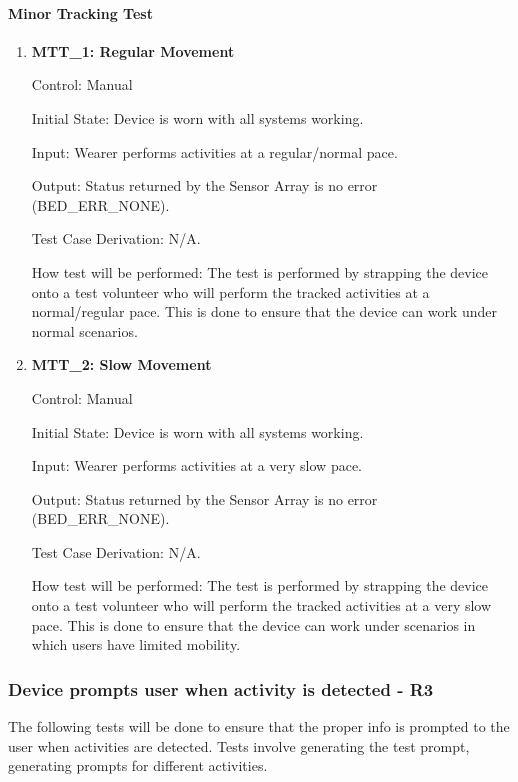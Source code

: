 \documentclass[12pt, titlepage]{article}
\begin{document}
\paragraph{Minor Tracking Test}
\begin{enumerate}
	\item{\textbf{MTT\_1: Regular Movement} \\}
	
		Control: Manual 
							
		Initial State: Device is worn with all systems working.
							
		Input: Wearer performs activities at a regular/normal pace.
		
		Output: Status returned by the Sensor Array is no error (BED\_ERR\_NONE).
		
		Test Case Derivation: N/A.
							
		How test will be performed: The test is performed by strapping the device onto a test volunteer who will perform the tracked activities at a normal/regular pace. This is done to ensure that the device can 				work under normal scenarios.

	\item{\textbf{MTT\_2: Slow Movement} \\}
	
		Control: Manual 
							
		Initial State: Device is worn with all systems working.
							
		Input: Wearer performs activities at a very slow pace.
		
		Output: Status returned by the Sensor Array is no error (BED\_ERR\_NONE).
		
		Test Case Derivation: N/A.
							
		How test will be performed: The test is performed by strapping the device onto a test volunteer who will perform the tracked activities at a very slow pace. This is done to ensure that the device can 						work under scenarios in which users have limited mobility.	

\end{enumerate}
\subsubsection{Device prompts user when activity is detected - \textbf{R3}}

The following tests will be done to ensure that the proper info is prompted to the user when activities are detected. Tests involve generating the test prompt, generating prompts for different activities.
		
\end{document}
